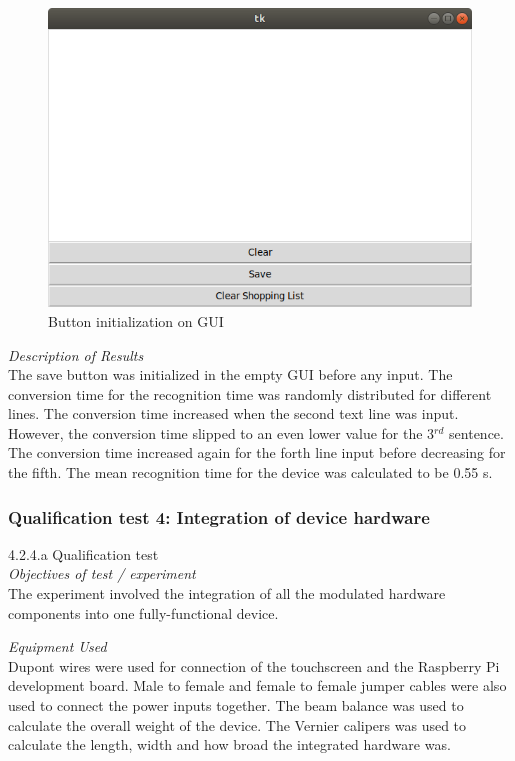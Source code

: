 \begin{figure}[h]
	\centering
	\includegraphics[scale=0.5]{107}
	\caption{Button initialization on GUI}
\end{figure}

\textit{Description of Results}\\
The save button was initialized in the empty GUI before any input. The conversion time for the recognition time was randomly distributed for different lines. The conversion time increased when the second text line was input. However, the conversion time slipped to an even lower value for the 3$^{rd}$ sentence. The conversion time increased again for the forth line input before decreasing for the fifth. The mean recognition time for the device was calculated to be 0.55 s.

\subsubsection{Qualification test 4: Integration of device hardware}

4.2.4.a Qualification test\\
\textit{Objectives of test / experiment}\\
The experiment involved the integration of all the modulated hardware components into one fully-functional device.

\textit{Equipment Used}\\
Dupont wires were used for connection of the touchscreen and the Raspberry Pi development board. Male to female and female to female jumper cables were also used to connect the power inputs together. The beam balance was used to calculate the overall weight of the device. The Vernier calipers was used to calculate the length, width and how broad the integrated hardware was. 


